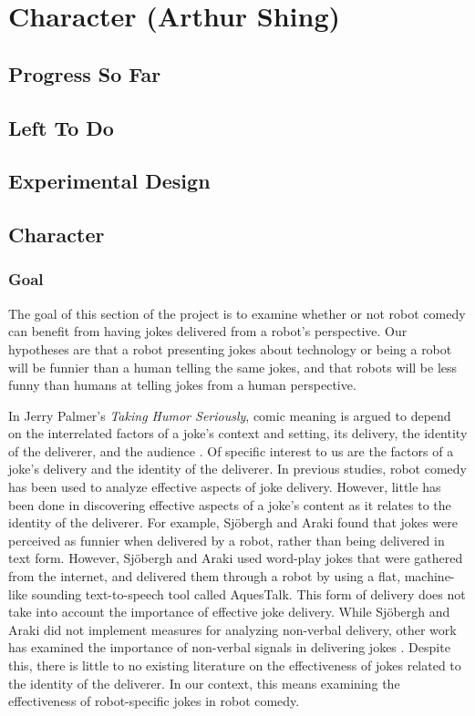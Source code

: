 ﻿\documentclass[onecolumn, draftclsnofoot,10pt, compsoc]{IEEEtran}
\begin{document}
\section{Character (Arthur Shing)}
\subsection{Progress So Far}
\subsection{Left To Do}
\subsection{Experimental Design}
\subsection{Character}
\subsubsection{Goal}
The goal of this section of the project is to examine whether or not robot comedy can benefit from having jokes delivered from a robot's perspective. Our hypotheses are that a robot presenting jokes about technology or being a robot will be funnier than a human telling the same jokes, and that robots will be less funny than humans at telling jokes from a human perspective.

In Jerry Palmer's \textit{Taking Humor Seriously}, comic meaning is argued to depend on the interrelated factors of a joke's context and setting, its delivery, the identity of the deliverer, and the audience \cite{Palmer:1993}.
Of specific interest to us are the factors of a joke's delivery and the identity of the deliverer.
In previous studies, robot comedy has been used to analyze effective aspects of joke delivery.
However, little has been done in discovering effective aspects of a joke's content as it relates to the identity of the deliverer.
For example, Sj\"{o}bergh and Araki \cite{RobotsMakeThings:2008} found that jokes were perceived as funnier when delivered by a robot, rather than being delivered in text form.
However, Sj\"{o}bergh and Araki used word-play jokes that were gathered from the internet, and delivered them through a robot by using a flat, machine-like sounding text-to-speech tool called AquesTalk. This form of delivery does not take into account the importance of effective joke delivery. While Sj\"{o}bergh and Araki did not implement measures for analyzing non-verbal delivery, other work has examined the importance of non-verbal signals in delivering jokes \cite{KatevasRobot:2014} \cite{KnightEightLessons:2011}.
Despite this, there is little to no existing literature on the effectiveness of jokes related to the identity of the deliverer.
In our context, this means examining the effectiveness of robot-specific jokes in robot comedy.
\end{document}
